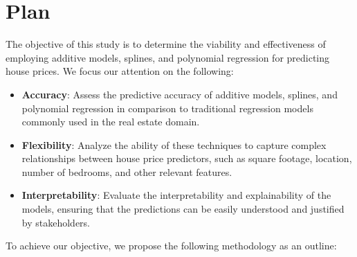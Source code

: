 \documentclass[aoas]{imsart}
\numberwithin{equation}{section}
\theoremstyle{plain}
\theoremstyle{remark}
\begin{document}
\hypertarget{plan}{%
\section{Plan}\label{plan}}

The objective of this study is to determine the viability and
effectiveness of employing additive models, splines, and polynomial
regression for predicting house prices. We focus our attention on the
following:

\begin{itemize}
\item
  \textbf{Accuracy}: Assess the predictive accuracy of additive models,
  splines, and polynomial regression in comparison to traditional
  regression models commonly used in the real estate domain.
    \vspace{0.2cm}
\item
  \textbf{Flexibility}: Analyze the ability of these techniques to
  capture complex relationships between house price predictors, such as
  square footage, location, number of bedrooms, and other relevant
  features.
  \vspace{0.2cm}
\item
  \textbf{Interpretability}: Evaluate the interpretability and
  explainability of the models, ensuring that the predictions can be
  easily understood and justified by stakeholders.
  \vspace{0.2cm}
\end{itemize}

To achieve our objective, we propose the following methodology as an
outline:
\end{document}
